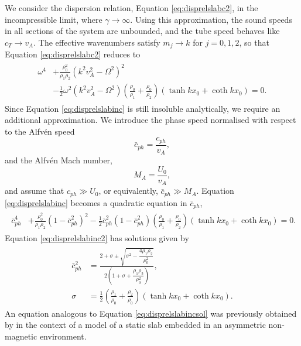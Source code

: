 \documentclass[12pt]{ociamthesis}
\begin{document}
We consider the dispersion relation, Equation \eqref{eq:disprelslabc2}, in the incompressible limit, where $\gamma \to \infty$.
Using this approximation, the sound speeds in all sections of the system are unbounded, and the tube speed behaves like $c_T \to v_A$.
The effective wavenumbers satisfy $m_j \to k$ for $j = 0, 1, 2$, so that Equation \eqref{eq:disprelslabc2} reduces to
%
\begin{align}
\label{eq:disprelslabinc}
\begin{split}
\omega^4
& + \frac{\rho_0^2}{\rho_1 \rho_2} ( k^2 v_A^2 - \Omega^2 )^2
\\
& - \frac{1}{2} \omega^2 ( k^2 v_A^2 - \Omega^2)
\left( \frac{\rho_0}{\rho_1} + \frac{\rho_0}{\rho_2} \right)
\left( \tanh k x_0 + \coth k x_0 \right) = 0.
\end{split}
\end{align}
%
Since Equation \eqref{eq:disprelslabinc} is still insoluble analytically, we require an additional approximation.
We introduce the phase speed normalised with respect to the Alfv\'en speed
%
\begin{equation}
\label{eq:cphbar}
\bar c_{ph} = \frac{c_{ph}}{v_A},
\end{equation}
%
and the Alfv\'en Mach number,
%
\begin{equation}
\label{eq:MA}
M_A = \frac{U_0}{v_A},
\end{equation}
%
and assume that $c_{ph} \gg U_0$, or equivalently, $\bar c_{ph} \gg M_A$.
Equation \eqref{eq:disprelslabinc} becomes a quadratic equation in $\bar c_{ph}$,
%
\begin{align}
\label{eq:disprelslabinc2}
\begin{split}
\bar c_{ph}^4
& + \frac{\rho_0^2}{\rho_1 \rho_2} ( 1 - \bar c_{ph}^2 )^2
- \frac{1}{2} \bar c_{ph}^2 ( 1 - \bar c_{ph}^2)
\left( \frac{\rho_0}{\rho_1} + \frac{\rho_0}{\rho_2} \right)
\left( \tanh k x_0 + \coth k x_0 \right) = 0.
\end{split}
\end{align}
%
Equation \eqref{eq:disprelslabinc2} has solutions given by
%
\begin{align}
\label{eq:disprelslabincsol}
\begin{split}
\bar c_{ph}^2 
& = \frac
{2 + \sigma \pm \sqrt{\sigma^2 - \dfrac{4\rho_1 \rho_2}{\rho_0^2} } }
{2 \left( 1 + \sigma + \dfrac{\rho_1 \rho_2}{\rho_0^2} \right) },
\\[0.3cm]
\sigma
& = \frac{1}{2} \left( \frac{\rho_1}{\rho_0} + \frac{\rho_2}{\rho_0} \right)
(\tanh k x_0 + \coth k x_0).
\end{split}
\end{align}
%
An equation analogous to Equation \eqref{eq:disprelslabincsol} was previously obtained by \cite{Allcock2017} in the context of a model of a static slab embedded in an asymmetric non-magnetic environment.
\end{document}
